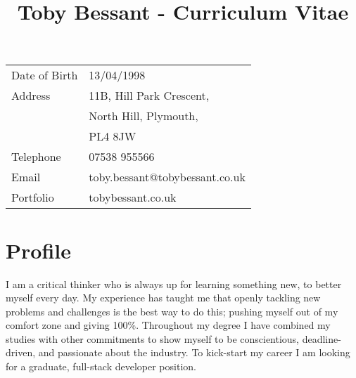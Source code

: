 \documentclass[11pt]{article}
\title{\bfseries\Huge Toby Bessant - Curriculum Vitae\vspace{-1.5em}}
\date{}
\begin{document}
\sloppy
\maketitle
\thispagestyle{fancy}
\begin{center}
\begin{tabular}[]{ll}
Date of Birth & 13/04/1998\\
Address        & 11B, Hill Park Crescent,\\ & North Hill, Plymouth,\\ & PL4 8JW \\ 
Telephone     &07538 955566\\
Email            & toby.bessant@tobybessant.co.uk\\
Portfolio        & tobybessant.co.uk\\
\end{tabular}
\end{center}
 
\section*{Profile}
\vspace*{-10pt}
I am a critical thinker who is always up for learning something new, to better myself every day. My experience has taught me that openly tackling new problems 
and challenges is the best way to do this; pushing myself out of my comfort zone and giving 100\%. Throughout my degree I have combined my studies with 
other commitments to show myself to be conscientious, deadline-driven, and passionate about the industry. To kick-start my career I am looking for a graduate, 
full-stack developer position.
 
\end{document}
